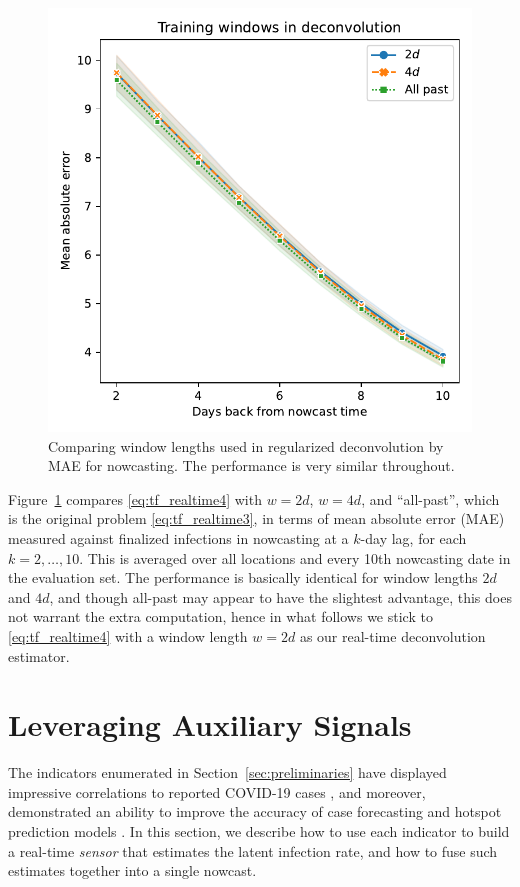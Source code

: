 \documentclass[sts]{imsart}
\theoremstyle{plain}
\theoremstyle{definition}
\theoremstyle{remark}
\begin{document}
\begin{figure}[tb]
\centering
\includegraphics[width=0.85\linewidth]{./figures/deconvolution_window_05_small_square.pdf}
\caption{Comparing window lengths used in regularized deconvolution by
  MAE for nowcasting. The performance is very similar throughout.}
\label{fig:deconvolution_window}
\end{figure}

Figure~\ref{fig:deconvolution_window} compares \eqref{eq:tf_realtime4} with
$w=2d$, $w=4d$, and ``all-past'', which is the original problem
\eqref{eq:tf_realtime3}, in terms of mean absolute error (MAE) measured against
finalized infections in nowcasting at a $k$-day lag, for each
$k=2,\ldots,10$. This is averaged over all locations and every 10th nowcasting
date in the evaluation set. The performance is basically identical for window
lengths $2d$ and $4d$, and though all-past may appear to have the slightest 
advantage, this does not warrant the extra computation, hence in what follows
we stick to \eqref{eq:tf_realtime4} with a window length $w=2d$ as our
real-time deconvolution estimator.    

\section{Leveraging Auxiliary Signals}
\label{sec:leverage_aux}

The indicators enumerated in Section~\ref{sec:preliminaries} have displayed
impressive correlations to reported COVID-19 cases \citep{Reinhart:2021}, and
moreover, demonstrated an ability to improve the accuracy of case forecasting
and hotspot prediction models \citep{McDonald:2021}. In this section, we
describe how to use each indicator to build a real-time \emph{sensor} that
estimates the latent infection rate, and how to fuse such estimates together
into a single nowcast.
\end{document}
